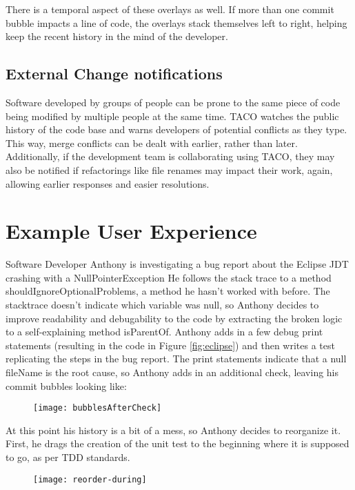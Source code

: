 \documentclass[conference]{IEEEtran}
\begin{document}
There is a temporal aspect of these overlays as well.
If more than one commit bubble impacts a line of code, the overlays stack
themselves left to right, helping keep the recent history in the mind of 
the developer.

\subsection{External Change notifications}
Software developed by groups of people can be prone to the same piece of code
being modified by multiple people at the same time.
TACO watches the public history of the code base and warns developers
of potential conflicts as they type.  
This way, merge conflicts can be dealt with earlier, rather than later.
Additionally, if the development team is collaborating using TACO, they
may also be notified if refactorings like file renames may impact their work, again, allowing earlier responses and easier resolutions.

\section{Example User Experience}
Software Developer Anthony is investigating a bug report about the Eclipse JDT crashing with a NullPointerException
He follows the stack trace to a method shouldIgnoreOptionalProblems, a method he hasn't worked with before.
The stacktrace doesn't indicate which variable was null, so Anthony decides to improve readability and debugability 
to the code by extracting the broken logic to a self-explaining method isParentOf.
Anthony adds in a few debug print statements (resulting in the code in Figure \ref{fig:eclipse}) and then writes a test replicating 
the steps in the bug report.
The print statements indicate that a null fileName is the root cause, so Anthony adds in an additional check,
leaving his commit bubbles looking like:
\begin{figure}[h]
\centering
\texttt{[image: bubblesAfterCheck]}
\end{figure}

At this point his history is a bit of a mess, so Anthony decides to reorganize it.
First, he drags the creation of the unit test to the beginning where it is supposed to go, as per TDD standards.
\begin{figure}[h]
\centering
\texttt{[image: reorder-during]}
\end{figure}
\end{document}
